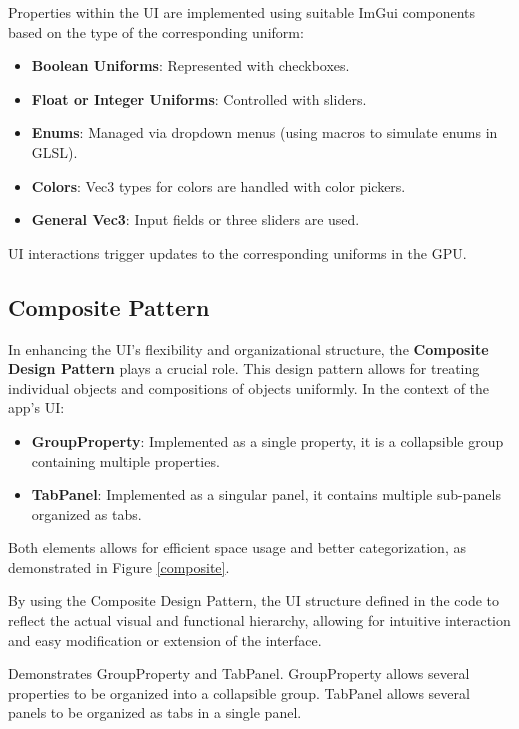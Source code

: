 Properties within the UI are implemented using suitable ImGui components based on the type of the corresponding uniform:

\begin{itemize}
    \item \textbf{Boolean Uniforms}: Represented with checkboxes.
    \item \textbf{Float or Integer Uniforms}: Controlled with sliders.
    \item \textbf{Enums}: Managed via dropdown menus (using macros to simulate enums in GLSL).
    \item \textbf{Colors}: Vec3 types for colors are handled with color pickers.
    \item \textbf{General Vec3}: Input fields or three sliders are used.
\end{itemize}

UI interactions trigger updates to the corresponding uniforms in the GPU.

\subsection{Composite Pattern}

In enhancing the UI's flexibility and organizational structure, the \textbf{Composite Design Pattern} plays a crucial role. This design pattern allows for treating individual objects and compositions of objects uniformly. In the context of the app's UI:

\begin{itemize}
    \item \textbf{GroupProperty}: Implemented as a single property, it is a collapsible group containing multiple properties.
    \item \textbf{TabPanel}: Implemented as a singular panel, it contains multiple sub-panels organized as tabs. 
\end{itemize}

Both elements allows for efficient space usage and better categorization, as demonstrated in Figure \ref{composite}.

By using the Composite Design Pattern, the UI structure defined in the code to reflect the actual visual and functional hierarchy, allowing for intuitive interaction and easy modification or extension of the interface.

{Demonstrates GroupProperty and TabPanel. GroupProperty allows several properties to be organized into a collapsible group. TabPanel allows several panels to be organized as tabs in a single panel.}


